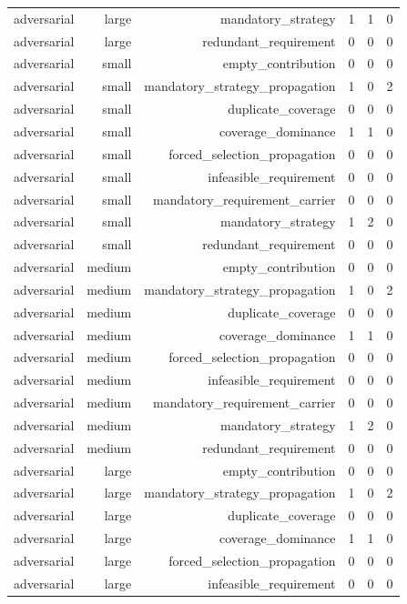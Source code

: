 {\begin{longtable}{lrrrrr}
adversarial & large & mandatory\_strategy & 1 & 1 & 0 \\
adversarial & large & redundant\_requirement & 0 & 0 & 0 \\
adversarial & small & empty\_contribution & 0 & 0 & 0 \\
adversarial & small & mandatory\_strategy\_propagation & 1 & 0 & 2 \\
adversarial & small & duplicate\_coverage & 0 & 0 & 0 \\
adversarial & small & coverage\_dominance & 1 & 1 & 0 \\
adversarial & small & forced\_selection\_propagation & 0 & 0 & 0 \\
adversarial & small & infeasible\_requirement & 0 & 0 & 0 \\
adversarial & small & mandatory\_requirement\_carrier & 0 & 0 & 0 \\
adversarial & small & mandatory\_strategy & 1 & 2 & 0 \\
adversarial & small & redundant\_requirement & 0 & 0 & 0 \\
adversarial & medium & empty\_contribution & 0 & 0 & 0 \\
adversarial & medium & mandatory\_strategy\_propagation & 1 & 0 & 2 \\
adversarial & medium & duplicate\_coverage & 0 & 0 & 0 \\
adversarial & medium & coverage\_dominance & 1 & 1 & 0 \\
adversarial & medium & forced\_selection\_propagation & 0 & 0 & 0 \\
adversarial & medium & infeasible\_requirement & 0 & 0 & 0 \\
adversarial & medium & mandatory\_requirement\_carrier & 0 & 0 & 0 \\
adversarial & medium & mandatory\_strategy & 1 & 2 & 0 \\
adversarial & medium & redundant\_requirement & 0 & 0 & 0 \\
adversarial & large & empty\_contribution & 0 & 0 & 0 \\
adversarial & large & mandatory\_strategy\_propagation & 1 & 0 & 2 \\
adversarial & large & duplicate\_coverage & 0 & 0 & 0 \\
adversarial & large & coverage\_dominance & 1 & 1 & 0 \\
adversarial & large & forced\_selection\_propagation & 0 & 0 & 0 \\
adversarial & large & infeasible\_requirement & 0 & 0 & 0 \\

\end{longtable}}
